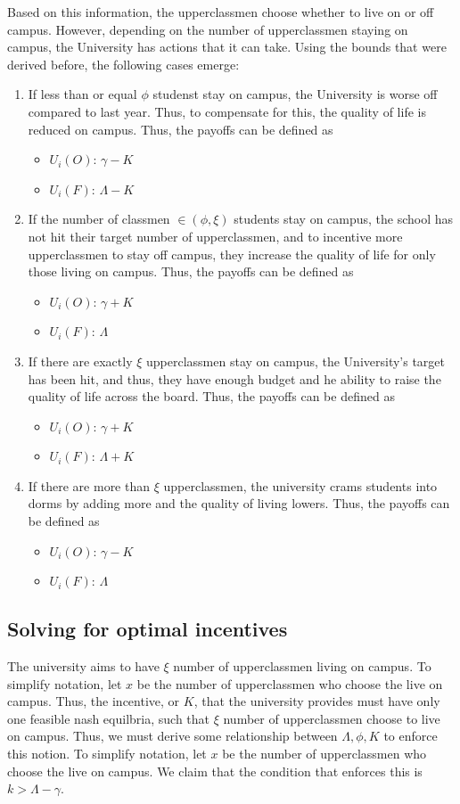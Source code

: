 \documentclass[12pt]{article}
\begin{document}
Based on this information, the upperclassmen choose whether to live on or off campus.
However, depending on the number of upperclassmen staying on campus, the University has actions that it can take. Using the bounds that were derived before, the following cases emerge:
\begin{enumerate}
    \item If less than or equal $\phi$ studenst stay on campus, the University is worse off compared to last year. Thus, to compensate for this, the quality of life is reduced on campus. Thus, the payoffs can be defined as \begin{itemize}
        \item $U_i(O)$: $\gamma - K$
        \item $U_i(F)$: $\Lambda - K$
    \end{itemize}
    \item If the number of classmen  $ \in (\phi,\xi)$ students stay on campus, the school has not hit their target number of upperclassmen, and to incentive more upperclassmen to stay off campus, they increase the quality of life for only those living on campus. Thus, the payoffs can be defined as \begin{itemize}
        \item $U_i(O)$: $\gamma + K$
        \item $U_i(F)$: $\Lambda$
    \end{itemize}
    \item If there are exactly $\xi$ upperclassmen stay on campus, the University's target has been hit, and thus, they have enough budget and he ability to raise the quality of life across the board. Thus, the payoffs can be defined as \begin{itemize}
        \item $U_i(O)$: $\gamma + K$
        \item $U_i(F)$: $\Lambda + K$
    \end{itemize}
    \item If there are more than $\xi$ upperclassmen, the university crams students into dorms by adding more and the quality of living lowers. Thus, the payoffs can be defined as \begin{itemize}
        \item $U_i(O)$: $\gamma - K$
        \item $U_i(F)$: $\Lambda$
    \end{itemize}
\end{enumerate}
\subsection{Solving for optimal incentives}
The university aims to have $\xi$ number of upperclassmen living on campus. To simplify notation, let $x$ be the number of upperclassmen who choose the live on campus. Thus, the incentive, or $K$, that the university provides must have only one feasible nash equilbria, such that $\xi$ number of upperclassmen choose to live on campus. Thus, we must derive some relationship between $\Lambda, \phi, K$ to enforce this notion. To simplify notation, let $x$ be the number of upperclassmen who choose the live on campus. We claim that the condition that enforces this is $k > \Lambda - \gamma$. 
\end{document}
